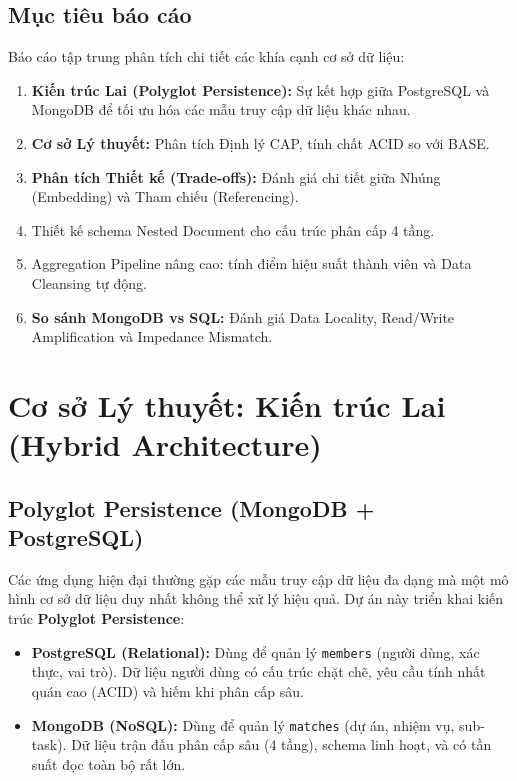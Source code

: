 \documentclass[a4paper,12pt]{article}
\begin{document}
\subsection{Mục tiêu báo cáo}
Báo cáo tập trung phân tích chi tiết các khía cạnh cơ sở dữ liệu:
\begin{enumerate}
    \item \textbf{Kiến trúc Lai (Polyglot Persistence):} Sự kết hợp giữa PostgreSQL và MongoDB để tối ưu hóa các mẫu truy cập dữ liệu khác nhau.
    \item \textbf{Cơ sở Lý thuyết:} Phân tích Định lý CAP, tính chất ACID so với BASE.
    \item \textbf{Phân tích Thiết kế (Trade-offs):} Đánh giá chi tiết giữa Nhúng (Embedding) và Tham chiếu (Referencing).
    \item Thiết kế schema Nested Document cho cấu trúc phân cấp 4 tầng.
    \item Aggregation Pipeline nâng cao: tính điểm hiệu suất thành viên và Data Cleansing tự động.
    \item \textbf{So sánh MongoDB vs SQL:} Đánh giá Data Locality, Read/Write Amplification và Impedance Mismatch.
\end{enumerate}

\newpage

\section{Cơ sở Lý thuyết: Kiến trúc Lai (Hybrid Architecture)}

\subsection{Polyglot Persistence (MongoDB + PostgreSQL)}
Các ứng dụng hiện đại thường gặp các mẫu truy cập dữ liệu đa dạng mà một mô hình cơ sở dữ liệu duy nhất không thể xử lý hiệu quả. Dự án này triển khai kiến trúc \textbf{Polyglot Persistence}:
\begin{itemize}
    \item \textbf{PostgreSQL (Relational):} Dùng để quản lý \texttt{members} (người dùng, xác thực, vai trò). Dữ liệu người dùng có cấu trúc chặt chẽ, yêu cầu tính nhất quán cao (ACID) và hiếm khi phân cấp sâu.
    \item \textbf{MongoDB (NoSQL):} Dùng để quản lý \texttt{matches} (dự án, nhiệm vụ, sub-task). Dữ liệu trận đấu phân cấp sâu (4 tầng), schema linh hoạt, và có tần suất đọc toàn bộ rất lớn.
\end{itemize}
\end{document}

